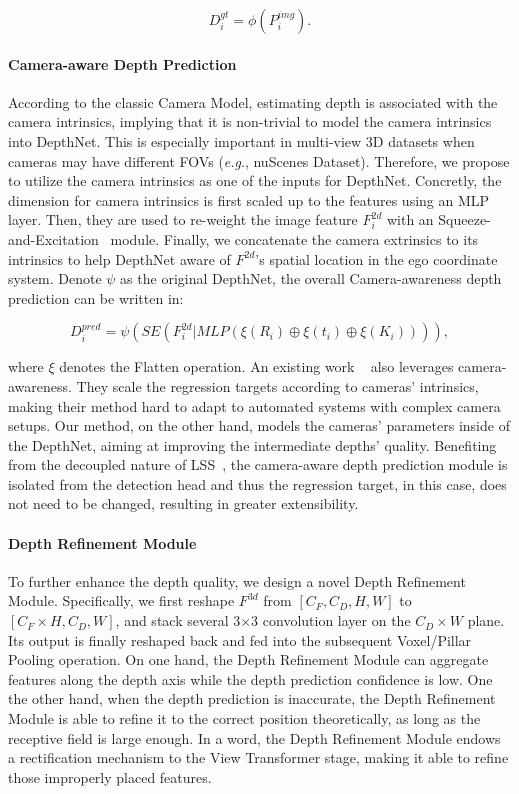 \documentclass[twocolumn,letterpaper]{article}
\begin{document}
\begin{equation}\label{dgt}
    D_i^{gt} = \phi(P_i^{img}).
\end{equation}

\paragraph{Camera-aware Depth Prediction}

According to the classic Camera Model, estimating depth is associated with the camera intrinsics, implying that it is non-trivial to model the camera intrinsics into DepthNet. This is especially important in multi-view 3D datasets when cameras may have different FOVs (\emph{e.g}., nuScenes Dataset). Therefore, we propose to utilize the camera intrinsics as one of the inputs for DepthNet. Concretly, the dimension for camera intrinsics is first scaled up to the features using an MLP layer. Then, they are used to re-weight the image feature $F_i^{2d}$ with an Squeeze-and-Excitation~\cite{senet} module. Finally, we concatenate the camera extrinsics to its intrinsics to help DepthNet aware of $F^{2d}$'s spatial location in the ego coordinate system. Denote $\psi$ as the original DepthNet, the overall Camera-awareness depth prediction can be written in:

\begin{equation}
    D_i^{pred} = \psi(SE(F_i^{2d}| MLP(\xi(R_i) \oplus \xi(t_i) \oplus \xi(K_i)))),
\end{equation}

\noindent where $\xi$ denotes the Flatten operation. An existing work ~\cite{dd3d} also leverages camera-awareness. They scale the regression targets according to cameras' intrinsics, making their method hard to adapt to automated systems with complex camera setups. Our method, on the other hand, models the cameras' parameters inside of the DepthNet, aiming at improving the intermediate depths' quality. Benefiting from the decoupled nature of LSS~\cite{philion2020lift}, the camera-aware depth prediction module is isolated from the detection head and thus the regression target, in this case, does not need to be changed, resulting in greater extensibility.


\paragraph{Depth Refinement Module} To further enhance the depth quality, we design a novel Depth Refinement Module. Specifically, we first reshape $F^{3d}$ from $[C_F, C_D, H, W]$ to $[C_F\times H, C_D, W]$, and stack several 3$\times$3 convolution layer on the $C_D \times W$ plane. Its output is finally reshaped back and fed into the subsequent Voxel/Pillar Pooling operation. On one hand, the Depth Refinement Module can aggregate features along the depth axis while the depth prediction confidence is low. One the other hand, when the depth prediction is inaccurate, the Depth Refinement Module is able to refine it to the correct position theoretically, as long as the receptive field is large enough. In a word, the Depth Refinement Module endows a rectification mechanism to the View Transformer stage, making it able to refine those improperly placed features.
\end{document}
